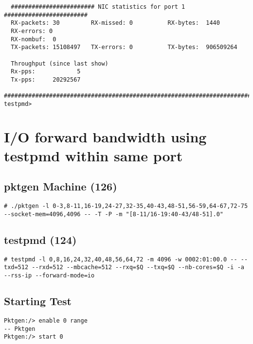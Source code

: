 \documentclass[letter]{article}
\begin{document}
{{\begin{lstlisting}
  ######################## NIC statistics for port 1  ########################
  RX-packets: 30         RX-missed: 0          RX-bytes:  1440
  RX-errors: 0
  RX-nombuf:  0         
  TX-packets: 15108497   TX-errors: 0          TX-bytes:  906509264

  Throughput (since last show)
  Rx-pps:            5
  Tx-pps:     20292567
  ############################################################################
testpmd> 

\end{lstlisting}

\section{I/O forward bandwidth using testpmd within same port}
{\setlength{\parindent}{0cm}

\subsection{pktgen Machine (126)}

\begin{lstlisting}
# ./pktgen -l 0-3,8-11,16-19,24-27,32-35,40-43,48-51,56-59,64-67,72-75 --socket-mem=4096,4096 -- -T -P -m "[8-11/16-19:40-43/48-51].0"
\end{lstlisting}

\subsection{testpmd (124)}

\begin{lstlisting}[escapechar=!]
# testpmd -l 0,8,16,24,32,40,48,56,64,72 -m 4096 -w 0002:01:00.0 -- --txd=512 --rxd=512 --mbcache=512 --rxq=$Q --txq=$Q --nb-cores=$Q -i -a --rss-ip --forward-mode=io
\end{lstlisting}

\subsection{Starting Test}

\begin{lstlisting}[escapechar=!]
Pktgen:/> enable 0 range
-- Pktgen 
Pktgen:/> start 0
\end{lstlisting}

}}}
\end{document}
